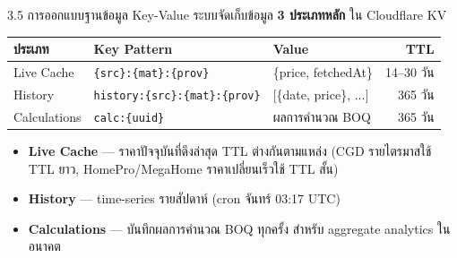\documentclass[aspectratio=169,11pt]{beamer}
\begin{document}
\begin{frame}{3.5 การออกแบบฐานข้อมูล Key-Value}
  ระบบจัดเก็บข้อมูล \textbf{3 ประเภทหลัก} ใน Cloudflare KV
  \begin{table}
    \centering
    \footnotesize
    \begin{tabularx}{\textwidth}{l l X r}
      \toprule
      \textbf{ประเภท} & \textbf{Key Pattern} & \textbf{Value} & \textbf{TTL} \\
      \midrule
      Live Cache    & \texttt{\{src\}:\{mat\}:\{prov\}}     & \{price, fetchedAt\}      & 14--30 วัน \\
      History       & \texttt{history:\{src\}:\{mat\}:\{prov\}} & [\{date, price\}, ...]  & 365 วัน \\
      Calculations  & \texttt{calc:\{uuid\}}                 & ผลการคำนวณ BOQ           & 365 วัน \\
      \bottomrule
    \end{tabularx}
  \end{table}
  \vspace{0.3em}
  \begin{itemize}
    \item \textbf{Live Cache} --- ราคาปัจจุบันที่ดึงล่าสุด TTL ต่างกันตามแหล่ง
          (CGD รายไตรมาสใช้ TTL ยาว, HomePro/MegaHome ราคาเปลี่ยนเร็วใช้ TTL สั้น)
    \item \textbf{History} --- time-series รายสัปดาห์ (cron จันทร์ 03:17 UTC)
    \item \textbf{Calculations} --- บันทึกผลการคำนวณ BOQ ทุกครั้ง สำหรับ
          aggregate analytics ในอนาคต
  \end{itemize}
\end{frame}
\end{document}
